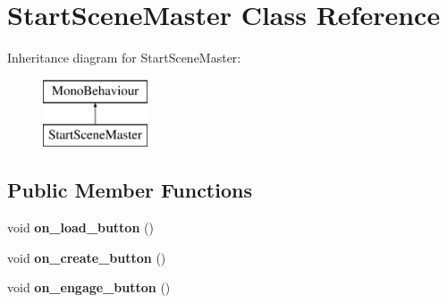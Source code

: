 \hypertarget{class_start_scene_master}{}\section{Start\+Scene\+Master Class Reference}
\label{class_start_scene_master}
Inheritance diagram for Start\+Scene\+Master\+:\begin{figure}[H]
\begin{center}
\leavevmode
\includegraphics[height=2.000000cm]{class_start_scene_master}
\end{center}
\end{figure}
\subsection*{Public Member Functions}
\begin{DoxyCompactItemize}
\item 
\mbox{\label{class_start_scene_master_a4bee5f01bc1a3780f5be02ed236fdebb}} 
void {\bfseries on\+\_\+load\+\_\+button} ()
\item 
\mbox{\label{class_start_scene_master_a1ad0a649fbdaf0eb29b37d89f315a488}} 
void {\bfseries on\+\_\+create\+\_\+button} ()
\item 
\mbox{\label{class_start_scene_master_a2d87228fe8c5ef7ad93fa916be1d1d17}} 
void {\bfseries on\+\_\+engage\+\_\+button} ()
\end{DoxyCompactItemize}
